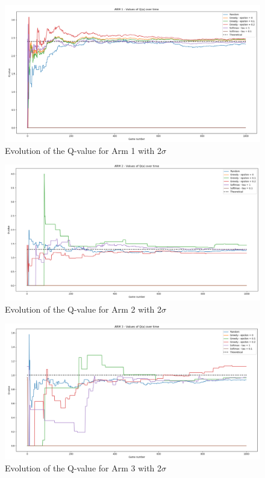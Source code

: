 \documentclass{article}
\begin{document}
\begin{figure}[H]
  \centering
  \includegraphics[scale=0.35]{fig/bandit2-arm1.png}
  \caption{Evolution of the Q-value for Arm 1 with 2$\sigma$}
  \label{fig:bandit2-arm1}
\end{figure}

\begin{figure}[H]
  \centering
  \includegraphics[scale=0.37]{fig/bandit2-arm2.png}
  \caption{Evolution of the Q-value for Arm 2 with 2$\sigma$}
  \label{fig:bandit2-arm2}
\end{figure}

\begin{figure}[H]
  \centering
  \includegraphics[scale=0.37]{fig/bandit2-arm3.png}
  \caption{Evolution of the Q-value for Arm 3 with 2$\sigma$}
  \label{fig:bandit2-arm3}
\end{figure}
\end{document}
